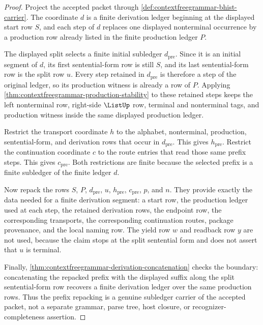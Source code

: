 \begin{proof}
Project the accepted packet through
\autoref{def:contextfreegrammar-bhist-carrier}. The coordinate $d$ is a finite
derivation ledger beginning at the displayed start row $S$, and each step of
$d$ replaces one displayed nonterminal occurrence by a production row already
listed in the finite production ledger $P$.

The displayed split selects a finite initial subledger
$d_{\mathrm{pre}}$. Since it is an initial segment of $d$, its first
sentential-form row is still $S$, and its last sentential-form row is the
split row $u$. Every step retained in $d_{\mathrm{pre}}$ is therefore a step
of the original ledger, so its production witness is already a row of $P$.
Applying \autoref{thm:contextfreegrammar-production-stability} to these
retained steps keeps the left nonterminal row, right-side $\ListUp$ row,
terminal and nonterminal tags, and production witness inside the same
displayed production ledger.

Restrict the transport coordinate $h$ to the alphabet, nonterminal,
production, sentential-form, and derivation rows that occur in
$d_{\mathrm{pre}}$. This gives $h_{\mathrm{pre}}$. Restrict the continuation
coordinate $c$ to the route entries that read those same prefix steps. This
gives $c_{\mathrm{pre}}$. Both restrictions are finite because the selected
prefix is a finite subledger of the finite ledger $d$.

Now repack the rows
$S$, $P$, $d_{\mathrm{pre}}$, $u$, $h_{\mathrm{pre}}$,
$c_{\mathrm{pre}}$, $p$, and $n$. They provide exactly the data needed for a
finite derivation segment: a start row, the production ledger used at each
step, the retained derivation rows, the endpoint row, the corresponding
transports, the corresponding continuation routes, package provenance, and
the local naming row. The yield row $w$ and readback row $y$ are not used,
because the claim stops at the split sentential form and does not assert that
$u$ is terminal.

Finally, \autoref{thm:contextfreegrammar-derivation-concatenation} checks the
boundary: concatenating the repacked prefix with the displayed suffix along
the split sentential-form row recovers a finite derivation ledger over the
same production rows. Thus the prefix repacking is a genuine subledger carrier
of the accepted packet, not a separate grammar, parse tree, host closure, or
recognizer-completeness assertion.
\end{proof}

